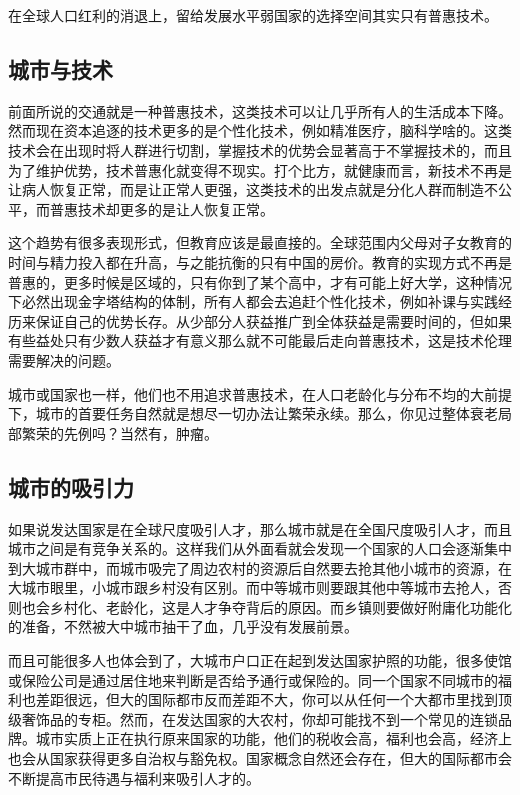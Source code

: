 \documentclass[]{book}
\begin{document}
在全球人口红利的消退上，留给发展水平弱国家的选择空间其实只有普惠技术。

\hypertarget{ux57ceux5e02ux4e0eux6280ux672f}{%
\subsection{城市与技术}\label{ux57ceux5e02ux4e0eux6280ux672f}}

前面所说的交通就是一种普惠技术，这类技术可以让几乎所有人的生活成本下降。然而现在资本追逐的技术更多的是个性化技术，例如精准医疗，脑科学啥的。这类技术会在出现时将人群进行切割，掌握技术的优势会显著高于不掌握技术的，而且为了维护优势，技术普惠化就变得不现实。打个比方，就健康而言，新技术不再是让病人恢复正常，而是让正常人更强，这类技术的出发点就是分化人群而制造不公平，而普惠技术却更多的是让人恢复正常。

这个趋势有很多表现形式，但教育应该是最直接的。全球范围内父母对子女教育的时间与精力投入都在升高，与之能抗衡的只有中国的房价。教育的实现方式不再是普惠的，更多时候是区域的，只有你到了某个高中，才有可能上好大学，这种情况下必然出现金字塔结构的体制，所有人都会去追赶个性化技术，例如补课与实践经历来保证自己的优势长存。从少部分人获益推广到全体获益是需要时间的，但如果有些益处只有少数人获益才有意义那么就不可能最后走向普惠技术，这是技术伦理需要解决的问题。

城市或国家也一样，他们也不用追求普惠技术，在人口老龄化与分布不均的大前提下，城市的首要任务自然就是想尽一切办法让繁荣永续。那么，你见过整体衰老局部繁荣的先例吗？当然有，肿瘤。

\hypertarget{ux57ceux5e02ux7684ux5438ux5f15ux529b}{%
\subsection{城市的吸引力}\label{ux57ceux5e02ux7684ux5438ux5f15ux529b}}

如果说发达国家是在全球尺度吸引人才，那么城市就是在全国尺度吸引人才，而且城市之间是有竞争关系的。这样我们从外面看就会发现一个国家的人口会逐渐集中到大城市群中，而城市吸完了周边农村的资源后自然要去抢其他小城市的资源，在大城市眼里，小城市跟乡村没有区别。而中等城市则要跟其他中等城市去抢人，否则也会乡村化、老龄化，这是人才争夺背后的原因。而乡镇则要做好附庸化功能化的准备，不然被大中城市抽干了血，几乎没有发展前景。

而且可能很多人也体会到了，大城市户口正在起到发达国家护照的功能，很多使馆或保险公司是通过居住地来判断是否给予通行或保险的。同一个国家不同城市的福利也差距很远，但大的国际都市反而差距不大，你可以从任何一个大都市里找到顶级奢饰品的专柜。然而，在发达国家的大农村，你却可能找不到一个常见的连锁品牌。城市实质上正在执行原来国家的功能，他们的税收会高，福利也会高，经济上也会从国家获得更多自治权与豁免权。国家概念自然还会存在，但大的国际都市会不断提高市民待遇与福利来吸引人才的。
\end{document}
